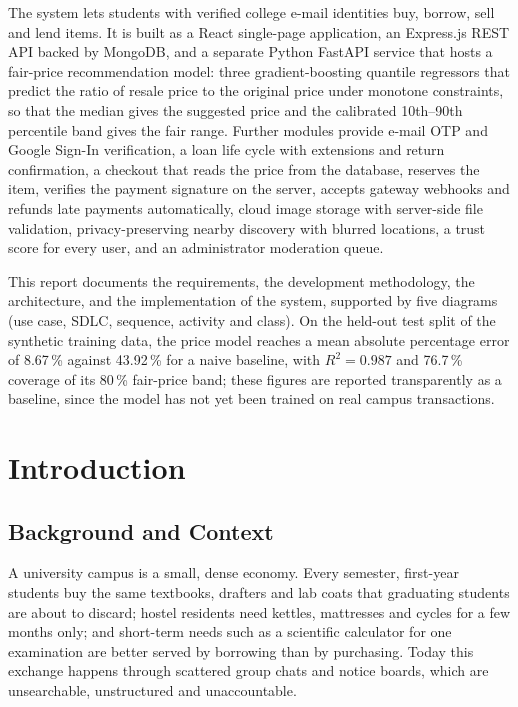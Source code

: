 \documentclass[11pt,letterpaper,oneside]{report}
\begin{document}
The system lets students with verified college e-mail identities buy, borrow, sell and lend items.
It is built as a React single-page application, an Express.js REST API backed by MongoDB, and
a separate Python FastAPI service that hosts a fair-price recommendation model: three
gradient-boosting quantile regressors that predict the ratio of resale price to the original price
under monotone constraints, so that the median gives the suggested price and the calibrated
10th--90th percentile band gives the fair range. Further modules provide e-mail OTP and Google
Sign-In verification, a loan life cycle with extensions and return confirmation, a checkout that
reads the price from the database, reserves the item, verifies the payment signature on the server,
accepts gateway webhooks and refunds late payments automatically, cloud image storage with
server-side file validation, privacy-preserving nearby discovery with blurred locations, a trust
score for every user, and an administrator moderation queue.

This report documents the requirements, the development methodology, the architecture, and
the implementation of the system, supported by five diagrams (use case, SDLC, sequence, activity
and class). On the held-out test split of the synthetic training data, the price model reaches a
mean absolute percentage error of 8.67\,\% against 43.92\,\% for a naive baseline, with
$R^2 = 0.987$ and 76.7\,\% coverage of its 80\,\% fair-price band; these figures are reported
transparently as a baseline, since the model has not yet been trained on real campus transactions.

\cleardoublepage
\tableofcontents
\listoffigures
\listoftables

\cleardoublepage
{}
\setcounter{page}{1}
\chapter{Introduction}

\section{Background and Context}
A university campus is a small, dense economy. Every semester, first-year students buy the same
textbooks, drafters and lab coats that graduating students are about to discard; hostel residents
need kettles, mattresses and cycles for a few months only; and short-term needs such as a
scientific calculator for one examination are better served by borrowing than by purchasing. Today
this exchange happens through scattered group chats and notice boards, which are unsearchable,
unstructured and unaccountable.
\end{document}
